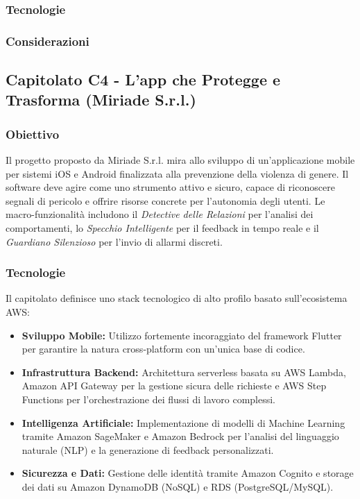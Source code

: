 \documentclass[a4paper, 10pt, colorlinks=true, linkcolor=black, urlcolor=blue, citecolor=blue, hidelinks]{article}
\begin{document}
\subsubsection{Tecnologie}

\subsubsection{Considerazioni}

\subsection{Capitolato C4 - L'app che Protegge e Trasforma (Miriade S.r.l.)}

\subsubsection{Obiettivo}
Il progetto proposto da Miriade S.r.l. mira allo sviluppo di un'applicazione mobile per sistemi iOS e Android finalizzata alla prevenzione della violenza di genere. Il software deve agire come uno strumento attivo e sicuro, capace di riconoscere segnali di pericolo e offrire risorse concrete per l'autonomia degli utenti. Le macro-funzionalità includono il \textit{Detective delle Relazioni} per l'analisi dei comportamenti, lo \textit{Specchio Intelligente} per il feedback in tempo reale e il \textit{Guardiano Silenzioso} per l'invio di allarmi discreti.

\subsubsection{Tecnologie}
Il capitolato definisce uno stack tecnologico di alto profilo basato sull'ecosistema AWS:
\begin{itemize}
    \item \textbf{Sviluppo Mobile:} Utilizzo fortemente incoraggiato del framework Flutter per garantire la natura cross-platform con un'unica base di codice.
    \item \textbf{Infrastruttura Backend:} Architettura serverless basata su AWS Lambda, Amazon API Gateway per la gestione sicura delle richieste e AWS Step Functions per l'orchestrazione dei flussi di lavoro complessi.
    \item \textbf{Intelligenza Artificiale:} Implementazione di modelli di Machine Learning tramite Amazon SageMaker e Amazon Bedrock per l'analisi del linguaggio naturale (NLP) e la generazione di feedback personalizzati.
    \item \textbf{Sicurezza e Dati:} Gestione delle identità tramite Amazon Cognito e storage dei dati su Amazon DynamoDB (NoSQL) e RDS (PostgreSQL/MySQL).
\end{itemize}
\end{document}
